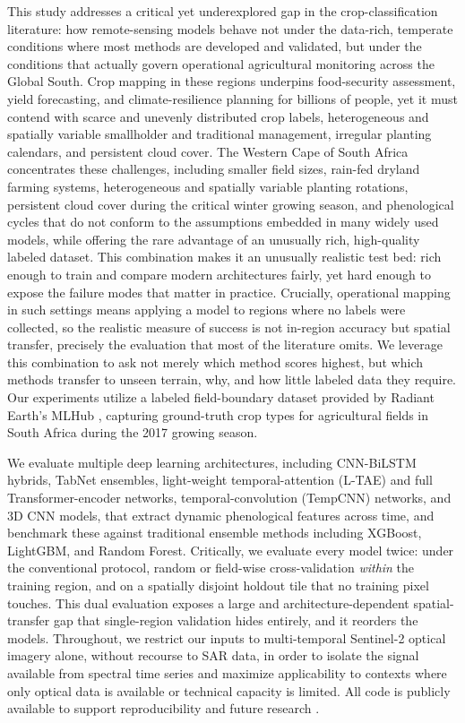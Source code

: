 \documentclass[pdflatex,sn-mathphys]{sn-jnl} %
\begin{document}
This study addresses a critical yet underexplored gap in the crop-classification literature: how remote-sensing models behave not under the data-rich, temperate conditions where most methods are developed and validated, but under the conditions that actually govern operational agricultural monitoring across the Global South. Crop mapping in these regions underpins food-security assessment, yield forecasting, and climate-resilience planning for billions of people, yet it must contend with scarce and unevenly distributed crop labels, heterogeneous and spatially variable smallholder and traditional management, irregular planting calendars, and persistent cloud cover. The Western Cape of South Africa concentrates these challenges, including smaller field sizes, rain-fed dryland farming systems, heterogeneous and spatially variable planting rotations, persistent cloud cover during the critical winter growing season, and phenological cycles that do not conform to the assumptions embedded in many widely used models, while offering the rare advantage of an unusually rich, high-quality labeled dataset. This combination makes it an unusually realistic test bed: rich enough to train and compare modern architectures fairly, yet hard enough to expose the failure modes that matter in practice. Crucially, operational mapping in such settings means applying a model to regions where no labels were collected, so the realistic measure of success is not in-region accuracy but spatial transfer, precisely the evaluation that most of the literature omits. We leverage this combination to ask not merely which method scores highest, but which methods transfer to unseen terrain, why, and how little labeled data they require. Our experiments utilize a labeled field-boundary dataset provided by Radiant Earth's MLHub \cite{mlhub}, capturing ground-truth crop types for agricultural fields in South Africa during the 2017 growing season.

We evaluate multiple deep learning architectures, including CNN-BiLSTM hybrids, TabNet ensembles, light-weight temporal-attention (L-TAE) and full Transformer-encoder networks, temporal-convolution (TempCNN) networks, and 3D CNN models, that extract dynamic phenological features across time, and benchmark these against traditional ensemble methods including XGBoost, LightGBM, and Random Forest. Critically, we evaluate every model twice: under the conventional protocol, random or field-wise cross-validation \emph{within} the training region, and on a spatially disjoint holdout tile that no training pixel touches. This dual evaluation exposes a large and architecture-dependent spatial-transfer gap that single-region validation hides entirely, and it reorders the models. Throughout, we restrict our inputs to multi-temporal Sentinel-2 optical imagery alone, without recourse to SAR data, in order to isolate the signal available from spectral time series and maximize applicability to contexts where only optical data is available or technical capacity is limited. All code is publicly available to support reproducibility and future research \cite{primary_repo}.
\end{document}
